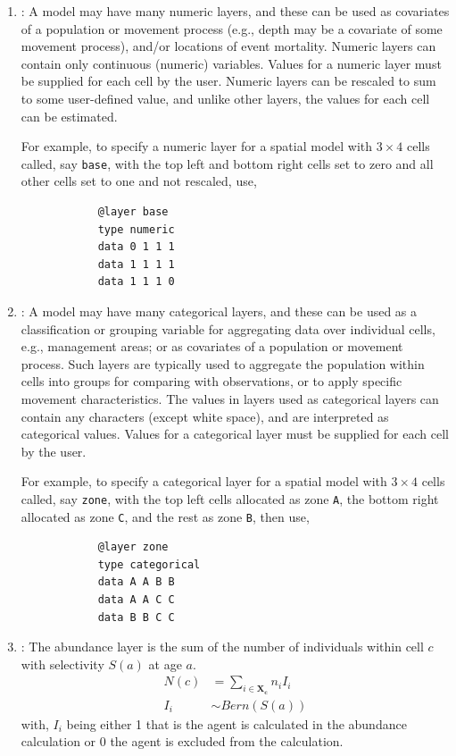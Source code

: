\begin{enumerate}
	\item{\label{numeric-layer}}: A model may have many numeric layers, and these can be used as covariates of a population or movement process (e.g., depth may be a covariate of some movement process), and/or locations of event mortality. Numeric layers can contain only continuous (numeric) variables. Values for a numeric layer must be supplied for each cell by the user. Numeric layers can be rescaled to sum to some user-defined value, and unlike other layers, the values for each cell can be estimated. 
	
	For example, to specify a numeric layer for a spatial model with $3 \times 4$ cells called, say \texttt{base}, with the top left and bottom right cells set to zero and all other cells set to one and not rescaled, use,
	{\small{\begin{verbatim}
			@layer base
			type numeric
			data 0 1 1 1
			data 1 1 1 1
			data 1 1 1 0
			\end{verbatim}}}
	
	\item {\label{categorical-layer}}: A model may have many categorical layers, and these can be used as a classification or grouping variable for aggregating data over individual cells, e.g., management areas; or as covariates of a population or movement process. Such layers are typically used to aggregate the population within cells into groups for comparing with observations, or to apply specific movement characteristics. The values in layers used as categorical layers can contain any characters (except white space), and are interpreted as categorical values. Values for a categorical layer must be supplied for each cell by the user.
	
	For example, to specify a categorical layer for a spatial model with $3 \times 4$ cells called, say \texttt{zone}, with the top left cells allocated as zone \texttt{A}, the bottom right allocated as zone \texttt{C}, and the rest as zone \texttt{B}, then use,
	{\small{\begin{verbatim}
			@layer zone
			type categorical
			data A A B B
			data A A C C
			data B B C C
			\end{verbatim}}}
	
	
	\item{}: The abundance layer is the sum of the number of individuals within cell $c$ with selectivity $S(a)$ at age $a$. 
	\begin{align}
	N(c) &= \sum\limits_{i \in \bm{X_c}} n_i I_i\\
	I_i &\sim Bern(S(a))
	\end{align}
	with, \(I_i\) being either 1 that is the agent is calculated in the abundance calculation or 0 the agent is excluded from the calculation.
	

\end{enumerate}
